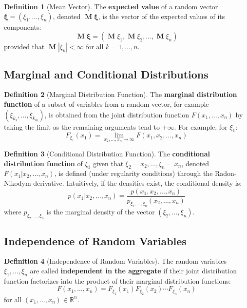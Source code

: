 \documentclass[12pt, openany]{book}
\theoremstyle{definition}
\newtheorem{definition}{Definition}[section]
\theoremstyle{plain}
\theoremstyle{remark}
\newcommand{\R}{\mathbb{R}}
\DeclareMathOperator{\M}{\mathbf{M}} %
\begin{document}
\begin{definition}[Mean Vector]
The \textbf{expected value} of a random vector $\boldsymbol{\xi} = (\xi_1, \dots, \xi_n)$, denoted $\M\boldsymbol{\xi}$, is the vector of the expected values of its components:
$$ \M\boldsymbol{\xi} = (\M\xi_1, \M\xi_2, \dots, \M\xi_n) $$
provided that $\M|\xi_k| < \infty$ for all $k=1, \dots, n$.
\end{definition}

\subsection{Marginal and Conditional Distributions}

\begin{definition}[Marginal Distribution Function]
The \textbf{marginal distribution function} of a subset of variables from a random vector, for example $(\xi_{k_1}, \dots, \xi_{k_m})$, is obtained from the joint distribution function $F(x_1, \dots, x_n)$ by taking the limit as the remaining arguments tend to $+\infty$. For example, for $\xi_1$:
$$ F_{\xi_1}(x_1) = \lim_{x_2, \dots, x_n \to \infty} F(x_1, x_2, \dots, x_n) $$
\end{definition}

\begin{definition}[Conditional Distribution Function]
The \textbf{conditional distribution function} of $\xi_1$ given that $\xi_2 = x_2, \dots, \xi_n = x_n$, denoted $F(x_1 | x_2, \dots, x_n)$, is defined (under regularity conditions) through the Radon-Nikodym derivative. Intuitively, if the densities exist, the conditional density is:
$$ p(x_1 | x_2, \dots, x_n) = \frac{p(x_1, x_2, \dots, x_n)}{p_{\xi_2, \dots, \xi_n}(x_2, \dots, x_n)} $$
where $p_{\xi_2, \dots, \xi_n}$ is the marginal density of the vector $(\xi_2, \dots, \xi_n)$.
\end{definition}

\subsection{Independence of Random Variables}

\begin{definition}[Independence of Random Variables]
The random variables $\xi_1, \dots, \xi_n$ are called \textbf{independent in the aggregate} if their joint distribution function factorizes into the product of their marginal distribution functions:
$$ F(x_1, \dots, x_n) = F_{\xi_1}(x_1) F_{\xi_2}(x_2) \cdots F_{\xi_n}(x_n) $$
for all $(x_1, \dots, x_n) \in \R^n$.
\end{definition}
\end{document}
